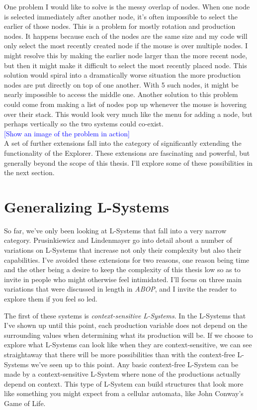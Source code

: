 \documentclass[12pt,twoside]{reedthesis}
\begin{document}
	One problem I would like to solve is the messy overlap of nodes. When one node is selected immediately after another node, it's often impossible to select the earlier of those nodes. This is a problem for mostly rotation and production nodes. It happens because each of the nodes are the same size and my code will only select the most recently created node if the mouse is over multiple nodes. I might resolve this by making the earlier node larger than the more recent node, but then it might make it difficult to select the most recently placed node. This solution would spiral into a dramatically worse situation the more production nodes are put directly on top of one another. With 5 such nodes, it might be nearly impossible to access the middle one. Another solution to this problem could come from making a list of nodes pop up whenever the mouse is hovering over their stack. This would look very much like the menu for adding a node, but perhaps vertically so the two systems could co-exist.\\
	
	\textcolor{blue}{[Show an image of the problem in action]}\\
	
	A set of further extensions fall into the category of significantly extending the functionality of the Explorer. These extensions are fascinating and powerful, but generally beyond the scope of this thesis. I'll explore some of these possibilities in the next section.

\section{Generalizing L-Systems}
\label{Generalizing}
So far, we've only been looking at L-Systems that fall into a very narrow category. Prusinkiewicz and Lindenmayer go into detail about a number of variations on L-Systems that increase not only their complexity but also their capabilities. I've avoided these extensions for two reasons, one reason being time and the other being a desire to keep the complexity of this thesis low so as to invite in people who might otherwise feel intimidated. I'll focus on three main variations that were discussed in length in \textit{ABOP}, and I invite the reader to explore them if you feel so led.

	The first of these systems is \textit{context-sensitive L-Systems}. In the L-Systems that I've shown up until this point, each production variable does not depend on the surrounding values when determining what its production will be. If we choose to explore what L-Systems can look like when they are context-sensitive, we can see straightaway that there will be more possibilities than with the context-free L-Systems we've seen up to this point. Any basic context-free L-System can be made by a context-sensitive L-System where none of the productions actually depend on context. This type of L-System can build structures that look more like something you might expect from a cellular automata, like John Conway's Game of Life.\\
	
\end{document}
